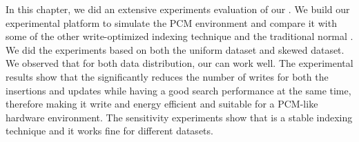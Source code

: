 In this chapter, we did an extensive experiments evaluation of our \bptree. We build our experimental
platform to simulate the PCM environment and compare it with some of the other write-optimized indexing
technique and the traditional normal \bplustree. We did the experiments based on both the uniform
dataset and skewed dataset. We observed that for both data distribution, our \bptree can work well.
The experimental results show that the \bptree significantly reduces
the number of writes for both the insertions and updates while having a good search performance at the same time,
therefore making it write and energy efficient and suitable for a PCM-like
hardware environment. The sensitivity experiments show that \bptree is a stable indexing technique and 
it works fine for different datasets. 


\newpage
